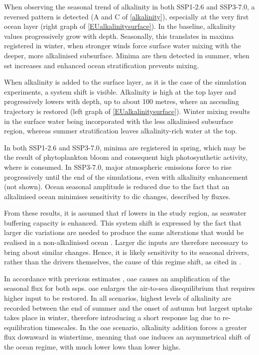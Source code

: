 When observing the seasonal trend of alkalinity in both SSP1-2.6 and SSP3-7.0, a reversed pattern is detected (A and C of \cref{alkalinity}), especially at the very first ocean layer (right graph of \cref{EUalkalinitysurface}). In the baseline, alkalinity values progressively grow with depth. Seasonally, this translates in maxima registered in winter, when stronger winds force surface water mixing with the deeper, more alkalinised subsurface. Minima are then detected in summer, when \ac{sst} increases and enhanced ocean stratification prevents mixing. 

When alkalinity is added to the surface layer, as it is the case of the simulation experiments, a system shift is visible. Alkalinity is high at the top layer and progressively lowers with depth, up to about 100 metres, where an ascending trajectory is restored (left graph of \cref{EUalkalinitysurface}). Winter mixing results in the surface water being incorporated with the less alkalinised subsurface region, whereas summer stratification leaves alkalinity-rich water at the top.

In both SSP1-2.6 and SSP3-7.0,  minima are registered in spring, which may be the result of phytoplankton bloom and consequent high photosynthetic activity, where  is consumed. In SSP3-7.0, major atmospheric  emissions force  to rise progressively until the end of the simulations, even with alkalinity enhancement (not shown). Ocean  seasonal amplitude is reduced due to the fact that an alkalinised ocean minimises  sensitivity to \ac{dic} changes, described by  fluxes.

From these results, it is assumed that \ac{rf} lowers in the study region, as seawater buffering capacity is enhanced. This system shift is expressed by the fact that larger \ac{dic} variations are needed to produce the same  alterations that would be realised in a non-alkalinised ocean \citep{schwinger2022report}. Larger \ac{dic} inputs are therefore necessary to bring about similar  changes. Hence, it is likely  sensitivity to its seasonal drivers, rather than the drivers themselves, the cause of this regime shift, as cited in \cite{lerner2021drivers}.

In accordance with previous estimates \citep{schwinger2022report}, \ac{oae} causes an amplification of the  seasonal flux for both \ac{ssp}s. \ac{oae} enlarges the air-to-sea disequilibrium that requires higher  input to be restored. In all scenarios, highest levels of alkalinity are recorded between the end of summer and the onset of autumn but largest uptake takes place in winter, therefore introducing a short response lag due to re-equilibration timescales. In the \ac{oae} scenario, alkalinity addition forces a greater  flux downward in wintertime, meaning that \ac{oae} induces an asymmetrical shift of the ocean regime, with much lower lows than lower highs.

